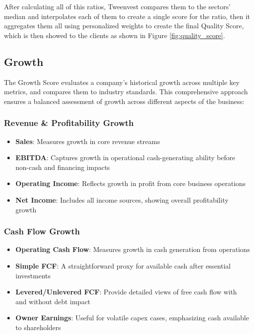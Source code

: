 \documentclass[11pt,english,a4paper,hidelinks]{book}
\begin{document}
\noindent After calculating all of this ratios, Tweenvest compares them to the sectors' median and interpolates each of them to create a single score for the ratio, then it aggregates them all using personalized weights to create the final Quality Score, which is then showed to the clients as shown in Figure \ref{fig:quality_score}.


\subsection{Growth}
\noindent The Growth Score evaluates a company's historical growth across multiple key metrics, and compares them to industry standards. This comprehensive approach ensures a balanced assessment of growth across different aspects of the business:

\subsubsection{Revenue \& Profitability Growth}
\begin{itemize}
    \item \textbf{Sales}: Measures growth in core revenue streams
    \item \textbf{EBITDA}: Captures growth in operational cash-generating ability before non-cash and financing impacts
    \item \textbf{Operating Income}: Reflects growth in profit from core business operations
    \item \textbf{Net Income}: Includes all income sources, showing overall profitability growth
\end{itemize}

\subsubsection{Cash Flow Growth}
\begin{itemize}
    \item \textbf{Operating Cash Flow}: Measures growth in cash generation from operations
    \item \textbf{Simple FCF}: A straightforward proxy for available cash after essential investments
    \item \textbf{Levered/Unlevered FCF}: Provide detailed views of free cash flow with and without debt impact
    \item \textbf{Owner Earnings}: Useful for volatile capex cases, emphasizing cash available to shareholders
\end{itemize}
\end{document}
